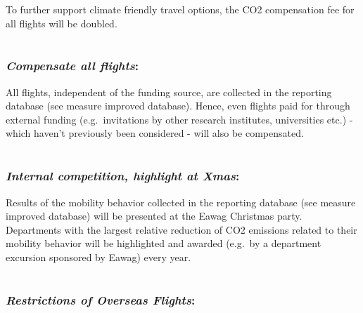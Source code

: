 \documentclass[]{tufte-handout}
\begin{document}
To further support climate friendly travel options, the CO2 compensation
fee for all flights will be doubled.

\hypertarget{compensate_all_flights}{%
\section{}\label{compensate_all_flights}}

\hypertarget{compensate-all-flights}{%
\subsubsection{\texorpdfstring{\emph{Compensate all
flights}:}{Compensate all flights:}}\label{compensate-all-flights}}

All flights, independent of the funding source, are collected in the
reporting database (see measure improved database). Hence, even flights
paid for through external funding (e.g.~invitations by other research
institutes, universities etc.) - which haven't previously been
considered - will also be compensated.

\hypertarget{internal_comp_xmas}{%
\section{}\label{internal_comp_xmas}}

\hypertarget{internal-competition-highlight-at-xmas}{%
\subsubsection{\texorpdfstring{\emph{Internal competition, highlight at
Xmas}:}{Internal competition, highlight at Xmas:}}\label{internal-competition-highlight-at-xmas}}

Results of the mobility behavior collected in the reporting database
(see measure improved database) will be presented at the Eawag Christmas
party. Departments with the largest relative reduction of CO2 emissions
related to their mobility behavior will be highlighted and awarded
(e.g.~by a department excursion sponsored by Eawag) every year.

\hypertarget{overseas_restriction}{%
\section{}\label{overseas_restriction}}

\hypertarget{restrictions-of-overseas-flights}{%
\subsubsection{\texorpdfstring{\emph{Restrictions of Overseas
Flights}:}{Restrictions of Overseas Flights:}}\label{restrictions-of-overseas-flights}}
\end{document}
